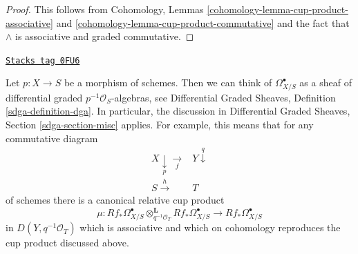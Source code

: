 \begin{proof}
This follows from
Cohomology, Lemmas \ref{cohomology-lemma-cup-product-associative} and
\ref{cohomology-lemma-cup-product-commutative}
and the fact that $\wedge$ is associative and graded commutative.
\end{proof}

\begin{remark}
\label{derham-remark-relative-cup-product}
\href{https://stacks.math.columbia.edu/tag/0FU6}{\texttt{Stacks tag 0FU6}}

Let $p : X \to S$ be a morphism of schemes. Then we can think of
$\Omega^\bullet_{X/S}$ as a sheaf of differential graded
$p^{-1}\mathcal{O}_S$-algebras, see
Differential Graded Sheaves, Definition \ref{sdga-definition-dga}.
In particular, the discussion in
Differential Graded Sheaves, Section \ref{sdga-section-misc}
applies. For example, this means that for any commutative diagram
$$
\begin{array}{cc}X \underset{p}{\downarrow}\underset{f}{\longrightarrow} & Y \overset{q}{\downarrow} \\ S \overset{h}{\longrightarrow} & T\end{array}
$$
of schemes there is a canonical relative cup product
$$
\mu :
Rf_*\Omega^\bullet_{X/S}
\otimes_{q^{-1}\mathcal{O}_T}^\mathbf{L}
Rf_*\Omega^\bullet_{X/S}
\longrightarrow
Rf_*\Omega^\bullet_{X/S}
$$
in $D(Y, q^{-1}\mathcal{O}_T)$ which is associative and
which on cohomology reproduces the cup product discussed above.
\end{remark}

